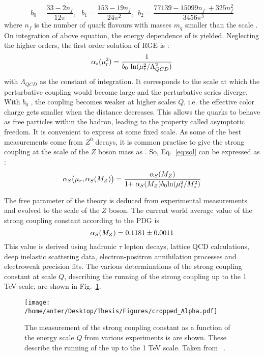 \begin{equation}
b_0 = \frac{33-2n_f}{12\pi}, ~~~b_1 = \frac{153-19n_f}{24\pi^2}, ~~b_2 = \frac{77139 - 15099n_f~\plus 325n^2_f}{3456\pi^3}
\end{equation}
where $n_f$ is the number of quark flavours with masses $m_q$ smaller than the scale \mur. On integration of above equation, the energy dependence of \alps is yielded. Neglecting the higher orders, the first order solution of RGE is :
\begin{equation}
\alpha_{s}(\mur^2)=\frac{1}{b_0~{\rm ln}(\mur^2/\Lambda^2_{QCD})}
\label{eq:sol}
\end{equation}
with $\Lambda_{QCD}$ as the constant of integration. It corresponds to the scale at which the perturbative coupling would become large and the perturbative series diverge. With $b_0$ , the coupling becomes weaker at higher scales $Q$, i.e. the effective color charge gets smaller when the distance decreases. This allows the quarks to behave as free particles within the hadron, leading to the property called asymptotic freedom. It is convenient to express \alps at some fixed scale. As some of the best measurements come from $Z^0$ decays, it is common practise to give the strong coupling at the scale of the $Z$ boson mass as \alpsmz. So, Eq.~\ref{eq:sol} can be expressed as :
\begin{equation}
\alps\big(\mur,\alpsmz\big) = \frac{\alpsmz}{1\plus\alpsmz b_0{\rm ln}(\mur^2/M^2_z)}
\end{equation}

The free parameter \alps of the theory is deduced from experimental measurements and evolved to the scale of the $Z$ boson. The current world average value of the strong coupling constant according to the PDG \cite{Patrignani:2016xqp} is 
\begin{equation}
\alpha_S(M_Z) = 0.1181 \pm 0.0011
\end{equation}
This value is derived using hadronic $\tau$ lepton decays, lattice QCD calculations, deep inelastic scattering data, electron-positron annihilation processes and electroweak precision fits. The various determinations of the strong coupling constant at scale $Q$, describing the running of the strong coupling up to the 1 TeV scale, are shown in Fig.~\ref{fig:alpha_pdg}.

\begin{figure}[!h]
\begin{center}
\hspace*{-7mm}
\texttt{[image: /home/anter/Desktop/Thesis/Figures/cropped\_Alpha.pdf]}\\
\vspace*{4mm}
\caption[PDG]{The measurement of the strong coupling constant \alps as a function of the energy scale $Q$ from various experiments is are shown. These describe the running of the \alps up to the 1 TeV scale. Taken from ~\cite{Patrignani:2016xqp}.}
\label{fig:alpha_pdg}
\end{center}
\end{figure}

